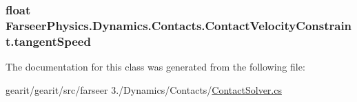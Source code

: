 \hypertarget{class_farseer_physics_1_1_dynamics_1_1_contacts_1_1_contact_velocity_constraint_ae926793d7f81b828c9c334568c3d8fe6}{
\subsubsection[{tangent\+Speed}]{\setlength{\rightskip}{0pt plus 5cm}float Farseer\+Physics.\+Dynamics.\+Contacts.\+Contact\+Velocity\+Constraint.\+tangent\+Speed}}\label{class_farseer_physics_1_1_dynamics_1_1_contacts_1_1_contact_velocity_constraint_ae926793d7f81b828c9c334568c3d8fe6}


The documentation for this class was generated from the following file\+:\begin{DoxyCompactItemize}
\item 
gearit/gearit/src/farseer 3./\+Dynamics/\+Contacts/\hyperlink{_contact_solver_8cs}{Contact\+Solver.\+cs}\end{DoxyCompactItemize}
